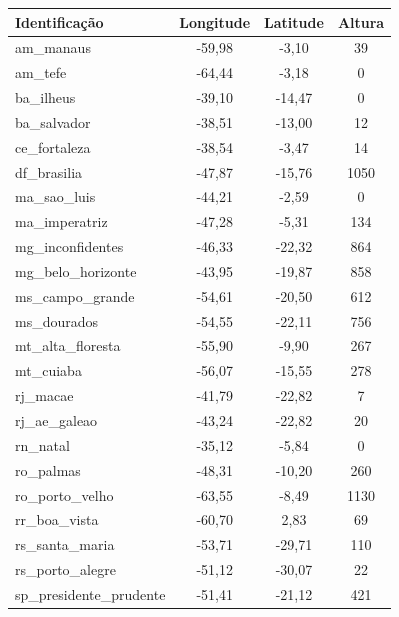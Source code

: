 \begin{table}[H]
\begin{center}
\begin{tabular}{|l|c|c|c|}
\hline
Identificação           & Longitude & Latitude & Altura \\ \hline
am\_manaus               & -59,98  & -3,10   & 39 \\ \hline
am\_tefe                 & -64,44  & -3,18   & 0 \\ \hline
ba\_ilheus               & -39,10  & -14,47  & 0 \\ \hline
ba\_salvador             & -38,51  & -13,00  & 12 \\ \hline
ce\_fortaleza            & -38,54  & -3,47   & 14 \\ \hline
df\_brasilia             & -47,87  & -15,76  & 1050 \\ \hline
ma\_sao\_luis             & -44,21  & -2,59   & 0 \\ \hline
ma\_imperatriz           & -47,28  & -5,31   & 134 \\ \hline
mg\_inconfidentes        & -46,33  & -22,32  & 864 \\ \hline
mg\_belo\_horizonte       & -43,95  & -19,87  & 858 \\ \hline
ms\_campo\_grande         & -54,61  & -20,50  & 612 \\ \hline
ms\_dourados             & -54,55  & -22,11  & 756 \\ \hline
mt\_alta\_floresta        & -55,90  & -9,90   & 267 \\ \hline
mt\_cuiaba               & -56,07  & -15,55  & 278 \\ \hline
rj\_macae                & -41,79  & -22,82  & 7 \\ \hline
rj\_ae\_galeao            & -43,24  & -22,82  & 20 \\ \hline
rn\_natal                & -35,12  & -5,84   & 0 \\ \hline
ro\_palmas               & -48,31  & -10,20  & 260 \\ \hline
ro\_porto\_velho          & -63,55  & -8,49   & 1130 \\ \hline
rr\_boa\_vista            & -60,70  & 2,83    & 69 \\ \hline
rs\_santa\_maria          & -53,71  & -29,71  & 110 \\ \hline
rs\_porto\_alegre         & -51,12  & -30,07  & 22 \\ \hline
sp\_presidente\_prudente  & -51,41  & -21,12  & 421 \\ \hline

\end{tabular}
\end{center}
\end{table}
